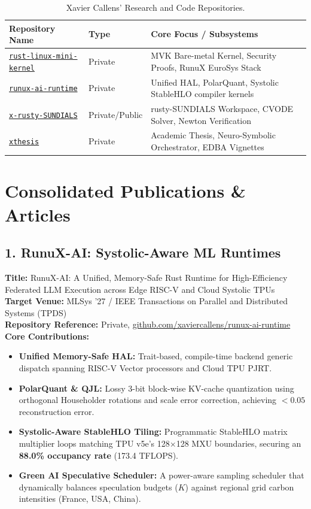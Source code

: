 \documentclass[11pt,a4paper]{article}
\begin{document}
\begin{table}[h]
\centering
\small
\begin{tabular}{lll}
\toprule
\textbf{Repository Name} & \textbf{Type} & \textbf{Core Focus / Subsystems} \\
\midrule
\href{https://github.com/xaviercallens/rust-linux-mini-kernel}{\texttt{rust-linux-mini-kernel}} & Private & MVK Bare-metal Kernel, Security Proofs, RunuX EuroSys Stack \\
\href{https://github.com/xaviercallens/runux-ai-runtime}{\texttt{runux-ai-runtime}} & Private & Unified HAL, PolarQuant, Systolic StableHLO compiler kernels \\
\href{https://github.com/xaviercallens/x-rusty-SUNDIALS}{\texttt{x-rusty-SUNDIALS}} & Private/Public & rusty-SUNDIALS Workspace, CVODE Solver, Newton Verification \\
\href{https://github.com/xaviercallens/xthesis}{\texttt{xthesis}} & Private & Academic Thesis, Neuro-Symbolic Orchestrator, EDBA Vignettes \\
\bottomrule
\end{tabular}
\caption{Xavier Callens' Research and Code Repositories.}
\label{tab:repos}
\end{table}

\section{Consolidated Publications \& Articles}

\subsection{1. RunuX-AI: Systolic-Aware ML Runtimes}
\textbf{Title:} RunuX-AI: A Unified, Memory-Safe Rust Runtime for High-Efficiency Federated LLM Execution across Edge RISC-V and Cloud Systolic TPUs \\
\textbf{Target Venue:} MLSys '27 / IEEE Transactions on Parallel and Distributed Systems (TPDS) \\
\textbf{Repository Reference:} Private, \url{github.com/xaviercallens/runux-ai-runtime} \\
\textbf{Core Contributions:}
\begin{itemize}
    \item \textbf{Unified Memory-Safe HAL:} Trait-based, compile-time backend generic dispatch spanning RISC-V Vector processors and Cloud TPU PJRT.
    \item \textbf{PolarQuant \& QJL:} Lossy 3-bit block-wise KV-cache quantization using orthogonal Householder rotations and scale error correction, achieving $<0.05$ reconstruction error.
    \item \textbf{Systolic-Aware StableHLO Tiling:} Programmatic StableHLO matrix multiplier loops matching TPU v5e's 128$\times$128 MXU boundaries, securing an \textbf{88.0\% occupancy rate} (173.4 TFLOPS).
    \item \textbf{Green AI Speculative Scheduler:} A power-aware sampling scheduler that dynamically balances speculation budgets ($K$) against regional grid carbon intensities (France, USA, China).
\end{itemize}
\end{document}

